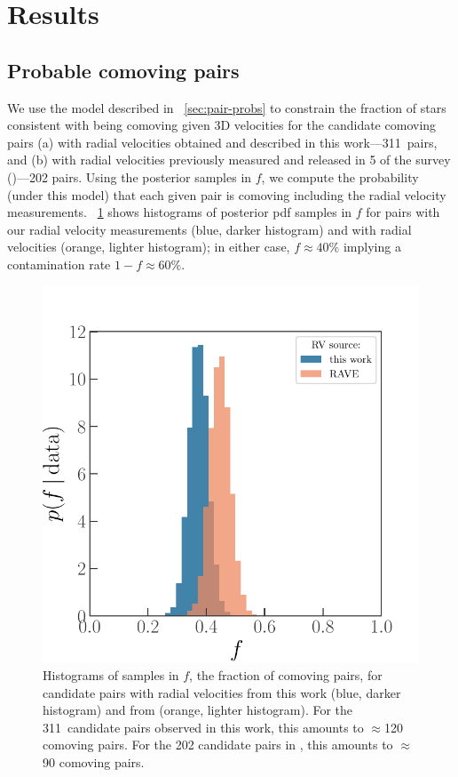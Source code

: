 \documentclass[modern, letterpaper]{aastex61}
\newcommand{\DR}[1]{\acronym{DR}#1}
\newcommand{\npairsobs}{311}
\begin{document}
\section{Results} \label{sec:results}

\subsection{Probable comoving pairs}\label{sec:genuine}

We use the model described in \sectionname~\ref{sec:pair-probs} to constrain the
fraction of stars consistent with being comoving given 3D velocities for the
candidate comoving pairs (a) with radial velocities obtained and described in
this work---\npairsobs\ pairs, and (b) with radial velocities previously
measured and released in \DR{5} of the  survey
(\citealt{Kunder:2017})---202 pairs.
Using the posterior samples in $f$, we compute the probability (under this
model) that each given pair is comoving including the radial velocity
measurements.
\figurename~\ref{fig:f-samples} shows histograms of posterior pdf samples in $f$
for pairs with our radial velocity measurements (blue, darker histogram) and
with  radial velocities (orange, lighter histogram); in either
case, $f \approx 40\%$ implying a contamination rate $1-f \approx 60\%$.

\begin{figure}[htb]
  \begin{center}
    \includegraphics[width=0.7\linewidth]{f_samples.pdf}
  \end{center}
  \caption{%
    Histograms of samples in $f$, the fraction of comoving pairs, for candidate
    pairs with radial velocities from this work (blue, darker histogram) and
    from  (orange, lighter histogram).
    For the \npairsobs\ candidate pairs observed in this work, this amounts to
    $\approx$120 comoving pairs.
    For the 202 candidate pairs in , this amounts to $\approx$90
    comoving pairs.
    \label{fig:f-samples}}
\end{figure}
\end{document}
